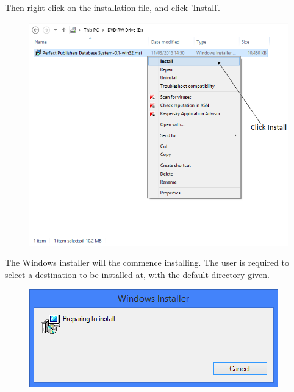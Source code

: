 Then right click on the installation file, and click 'Install'.

\begin{figure}[H]
    \includegraphics[width=\textwidth]{./Manual/Installation/Install.png}
\end{figure}

The Windows installer will the commence installing. The user is required to select a destination to be installed at, with the default directory given.

\begin{figure}[H]
    \includegraphics[width=\textwidth]{./Manual/Installation/PrepareInstall.png}
\end{figure}

